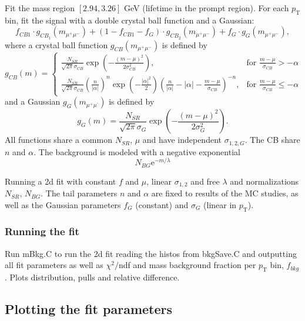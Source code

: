 \documentclass{article}
\newcommand{\pt}{p_\text{T}}
\begin{document}
Fit the mass region $[2.94, 3.26]$ GeV (lifetime in the prompt region). For each $\pt$ bin, fit the signal with a double crystal ball function and a Gaussian:
\begin{equation}
f_{CB1}\cdot g_{CB_1}(m_{\mu^+\mu^-})+(1-f_{CB1}-f_G)\cdot g_{CB_2}(m_{\mu^+\mu^-})+f_G\cdot g_G(m_{\mu^+\mu^-}),
\end{equation}
where a crystal ball function $g_{CB}(m_{\mu^+\mu^-})$ is defined by
\begin{equation}
g_{CB}(m) = \begin{cases}
\frac{N_{SR}}{\sqrt{2\pi}\sigma_{CB}}\exp\left(-\frac{(m-\mu)^2}{2\sigma^2_{CB}}\right), & \text{for }\frac{m-\mu}{\sigma_{CB}} > -\alpha \\
\frac{N_{SR}}{\sqrt{2\pi}\sigma_{CB}}\left(\frac{n}{|\alpha|}\right)^n\exp\left(-\frac{|\alpha|^2}{2}\right)\left(\frac{n}{|\alpha|}-|\alpha|-\frac{m-\mu}{\sigma_{CB}}\right)^{-n}, & \text{for }\frac{m-\mu}{\sigma_{CB}}\leq-\alpha
\end{cases}
\end{equation}
and a Gaussian $g_{G}(m_{\mu^+\mu^⁻})$ is defined by
\begin{equation}
g_{G}(m) = \frac{N_{SR}}{\sqrt{2\pi}\sigma_{G}}	\exp\left(-\frac{(m-\mu)^2}{2\sigma^2_{G}}\right).
\end{equation}
All functions share a common $N_{SR}$, $\mu$ and have independent $\sigma_{1,2,G}$. The CB share $n$ and $\alpha$. The background is modeled with a negative exponential
\begin{equation}
N_{BG} \text{e}^{- m / \lambda}
\end{equation}

Running a 2d fit with constant $f$ and $\mu$, linear $\sigma_{1,2}$ and free $\lambda$ and normalizations $N_{SR}$, $N_{BG}$. The tail parameters $n$ and $\alpha$ are fixed to results of the MC studies, as well as the Gaussian parameters $f_G$ (constant) and $\sigma_G$ (linear in $\pt$). 

\subsubsection{Running the fit}

Run mBkg.C to run the 2d fit reading the histos from bkgSave.C and outputting all fit parameters as well as $\chi^2/$ndf and mass background fraction per $\pt$ bin, $f_{bkg}$. Plots distribution, pulls and relative difference.

\pagebreak

\subsection{Plotting the fit parameters}
\end{document}
